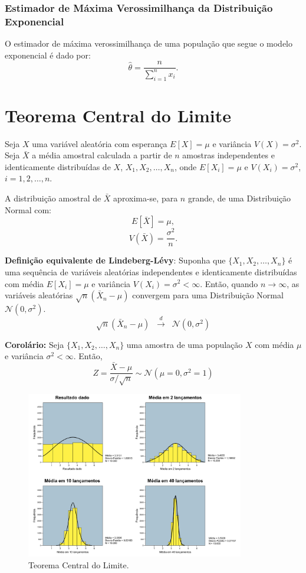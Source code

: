 \documentclass{article}
\begin{document}
\subsubsection{Estimador de Máxima Verossimilhança da Distribuição Exponencial}
O estimador de máxima verossimilhança de uma população que segue o modelo exponencial é dado por:
    $$
    \hat{\theta} = \frac{n}{\sum_{i=1}^n x_i}.
    $$

\section{Teorema Central do Limite}
Seja $X$ uma variável aleatória com esperança $E[X] = \mu$ e variância $V(X) = \sigma^2$. Seja $\bar{X}$ a média amostral calculada a partir de $n$ amostras independentes e identicamente distribuídas de $X$, $X_1, X_2, \ldots, X_n$, onde $E[X_i] = \mu$ e $V(X_i) = \sigma^2$, $i = 1, 2, \ldots, n$. 

A distribuição amostral de $\bar{X}$ aproxima-se, para $n$ grande, de uma Distribuição Normal com:
    $$E[\bar{X}] = \mu,$$
    $$V(\bar{X}) = \frac{\sigma^2}{n}.$$


\textbf{Definição equivalente de Lindeberg-Lévy}: Suponha que $\{X_1, X_2, \ldots, X_n\}$ é uma sequência de variáveis aleatórias independentes e identicamente distribuídas com média $E[X_i] = \mu$ e variância $V(X_i) = \sigma^2 < \infty$. Então, quando $n \to \infty$, as variáveis aleatórias $\sqrt{n}(\bar{X}_n - \mu)$ convergem para uma Distribuição Normal $\mathcal{N}(0, \sigma^2)$.  
    $$\sqrt{n}(\bar{X}_n - \mu) \;\;\overset{d}{\longrightarrow}\;\; \mathcal{N}(0, \sigma^2)$$

\textbf{Corolário:} Seja $\{X_1, X_2, \ldots, X_n\}$ uma amostra de uma população $X$ com média $\mu$ e variância $\sigma^2 < \infty$.  Então,
    $$Z = \frac{\bar{X} - \mu}{\sigma / \sqrt{n}} \sim \mathcal{N}(\mu = 0, \sigma^2 = 1)$$

\begin{figure}[H]
    \centering
    \includegraphics[width=0.85\textwidth]{figuras/teorema_central_limite.png}
    \caption{Teorema Central do Limite.}
    \label{fig:teorema_central_limite}
\end{figure}
\end{document}
